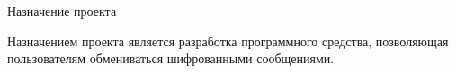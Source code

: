 \subsubsection {} Назначение проекта
\label{sec:analysis:research:req:destiny}

Назначением проекта является разработка программного средства, позволяющая пользователям обмениваться шифрованными сообщениями.